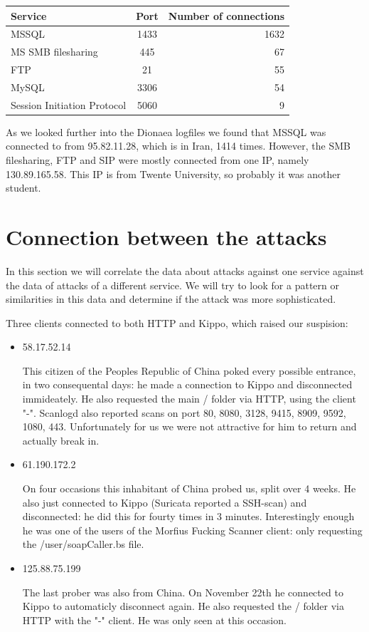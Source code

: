 \documentclass[11pt]{article}
\begin{document}
\begin{tabular}{|l|c|r|}
\hline
Service & Port & Number of connections \\ \hline
MSSQL  & 1433 & 1632 \\ \hline
MS SMB filesharing & 445 & 67 \\ \hline
FTP & 21 & 55 \\ \hline
MySQL & 3306 & 54 \\ \hline
Session Initiation Protocol & 5060 & 9 \\ \hline
\end{tabular}

As we looked further into the Dionaea logfiles we found that MSSQL was connected to from 95.82.11.28, which is in Iran, 1414 times. However, the SMB filesharing, FTP and SIP were mostly connected from one IP, namely 130.89.165.58. This IP is from Twente University, so probably it was another student.




\section{Connection between the attacks}
\label{Connection}
In this section we will correlate the data about attacks against one service against the data of attacks of a different service. We will try to look for a pattern or similarities in this data and determine if the attack was more sophisticated.

Three clients connected to both HTTP and Kippo, which raised our suspision:
\begin{itemize}
\item 58.17.52.14

This citizen of the Peoples Republic of China poked every possible entrance, in two consequental days: he made a connection to Kippo and disconnected immideately. He also requested the main / folder via HTTP, using the client "-". Scanlogd also reported scans on port 80, 8080, 3128, 9415, 8909, 9592, 1080, 443. Unfortunately for us we were not attractive for him to return and actually break in.

\item 61.190.172.2

On four occasions this inhabitant of China probed us, split over 4 weeks. He also just connected to Kippo (Suricata reported a SSH-scan) and disconnected: he did this for fourty times in 3 minutes. Interestingly enough he was one of the users of the Morfius Fucking Scanner client: only requesting the /user/soapCaller.bs file.

\item 125.88.75.199

The last prober was also from China. On November 22th he connected to Kippo to automaticly disconnect again. He also requested the / folder via HTTP with the "-" client. He was only seen at this occasion.

\end{itemize}
\end{document}
